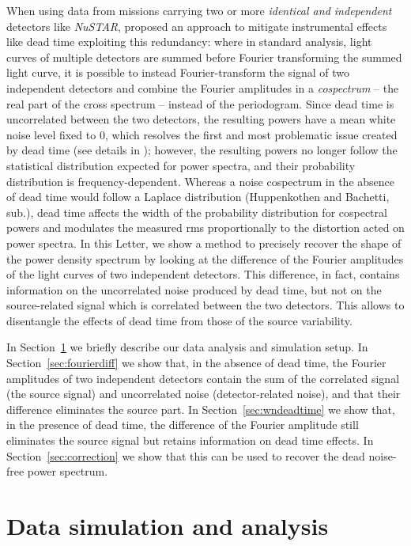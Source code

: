 \documentclass[twocolumn]{aastex61}
\newcommand{\project}[1]{\textsl{#1}}
\newcommand{\nustar}{\project{NuSTAR}\xspace}
\newcommand{\sref}{Section~\ref}
\begin{document}
When using data from missions carrying two or more \textit{identical and independent} detectors like \nustar, \citet{Bachetti+15} proposed an approach to mitigate instrumental effects like dead time exploiting this redundancy: 
where in standard analysis, light curves of multiple detectors are summed before Fourier transforming the summed light curve, 
it is possible to instead Fourier-transform the signal of two independent detectors and combine the Fourier amplitudes in a \textit{cospectrum} -- the real part of the cross spectrum -- instead of the periodogram. 
Since dead time is uncorrelated between the two detectors, the resulting powers have a mean white noise level fixed to 0, which resolves the first and most problematic issue created by dead time (see details in \citealt{Bachetti+15}); however, the resulting powers no longer follow the statistical distribution expected for power spectra, and their probability distribution is frequency-dependent.
Whereas a noise cospectrum in the absence of dead time would follow a Laplace distribution (Huppenkothen and Bachetti, sub.),
dead time affects the width of the probability distribution for cospectral powers and modulates the measured rms proportionally to the distortion acted on power spectra.
In this Letter, we show a method to precisely recover the shape of the power density spectrum by looking at the difference of the Fourier amplitudes of the light curves of two independent detectors.
This difference, in fact, contains information on the uncorrelated noise produced by dead time, but not on the source-related  signal which is correlated between the two detectors.
This allows to disentangle the effects of dead time from those of the source variability.

In \sref{sec:data} we briefly describe our data analysis and simulation setup.
In \sref{sec:fourierdiff} we show that, in the absence of dead time, the Fourier amplitudes of two independent detectors contain the sum of the correlated signal (the source signal) and uncorrelated noise (detector-related noise), and that their difference eliminates the source part. 
In \sref{sec:wndeadtime} we show that, in the presence of dead time, the difference of the Fourier amplitude still eliminates the source signal but retains information on dead time effects.
In \sref{sec:correction} we show that this can be used to recover the dead noise-free power spectrum.

\section{Data simulation and analysis} \label{sec:data}
\end{document}
